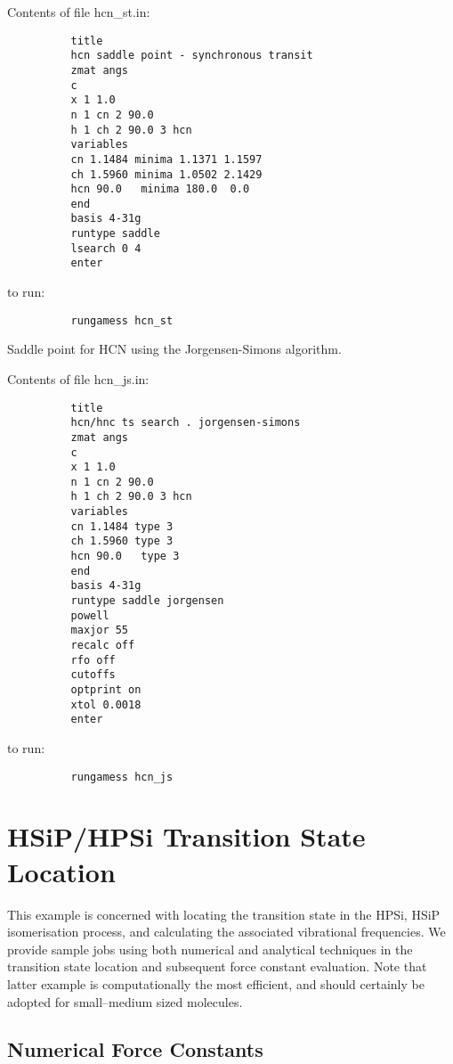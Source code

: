 \documentclass[11pt,fleqn]{article}
\begin{document}
Contents of file hcn\_st.in:
{
\footnotesize
\begin{verbatim}
          title
          hcn saddle point - synchronous transit
          zmat angs
          c
          x 1 1.0
          n 1 cn 2 90.0
          h 1 ch 2 90.0 3 hcn
          variables
          cn 1.1484 minima 1.1371 1.1597
          ch 1.5960 minima 1.0502 2.1429
          hcn 90.0   minima 180.0  0.0
          end
          basis 4-31g
          runtype saddle
          lsearch 0 4
          enter
\end{verbatim}
}
to run:
{
\footnotesize
\begin{verbatim}
          rungamess hcn_st
\end{verbatim}
}
Saddle point for HCN using the Jorgensen-Simons algorithm.

Contents of file hcn\_js.in:
{
\footnotesize
\begin{verbatim}
          title                
          hcn/hnc ts search . jorgensen-simons
          zmat angs
          c
          x 1 1.0
          n 1 cn 2 90.0
          h 1 ch 2 90.0 3 hcn
          variables
          cn 1.1484 type 3
          ch 1.5960 type 3
          hcn 90.0   type 3
          end
          basis 4-31g
          runtype saddle jorgensen 
          powell
          maxjor 55
          recalc off
          rfo off
          cutoffs
          optprint on
          xtol 0.0018
          enter          
\end{verbatim}
}
to run:
{
\footnotesize
\begin{verbatim}
          rungamess hcn_js
\end{verbatim}
}
\section[HSiP/HPSi Transition State Location]{HSiP/HPSi Transition State Location}
This example is concerned with locating the transition
state in the HPSi, HSiP isomerisation process, and calculating
the associated vibrational frequencies. We provide sample
jobs using both numerical and analytical techniques
in the transition state location and
subsequent force constant evaluation. Note that latter example is
computationally the most efficient, and should certainly
be adopted for small--medium sized molecules.

\subsection[Numerical Force Constants]{Numerical Force Constants}
\end{document}
